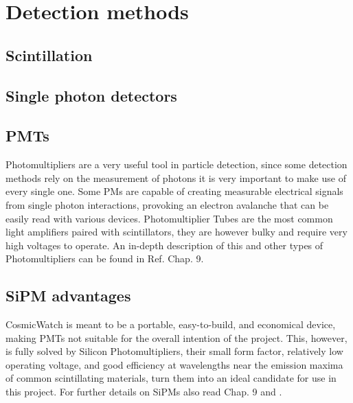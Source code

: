 \chapter{Detection methods} \label{chap:detection_methods}

\section{Scintillation}

\section{Single photon detectors}

\section{PMTs}

Photomultipliers are a very useful tool in particle detection, since some detection methods rely on the measurement of photons it is very important to make use of every single one. Some PMs are capable of creating measurable electrical signals from single photon interactions, provoking an electron avalanche that can be easily read with various devices. Photomultiplier Tubes are the most common light amplifiers paired with scintillators, they are however bulky and require very high voltages to operate. An in-depth description of this and other types of Photomultipliers can be found in Ref. \cite{knoll2010radiation} Chap. 9.

\section{SiPM advantages}

CosmicWatch is meant to be a portable, easy-to-build, and economical device, making PMTs not suitable for the overall intention of the project. This, however, is fully solved by Silicon Photomultipliers, their small form factor, relatively low operating voltage, and good efficiency at wavelengths near the emission maxima of common scintillating materials, turn them into an ideal candidate for use in this project. For further details on SiPMs also read \cite{knoll2010radiation} Chap. 9 and \cite{Onsemi_SiPM_intro}.

